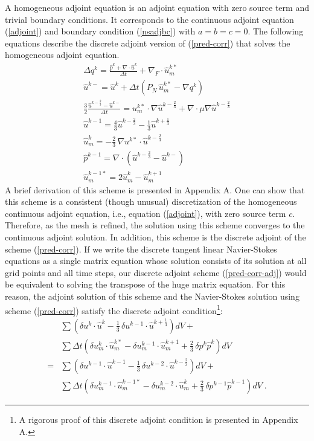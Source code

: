 A homogeneous adjoint equation is an adjoint equation with zero source term
and trivial boundary conditions.  It corresponds to the continuous adjoint
equation (\ref{adjoint}) and boundary condition (\ref{nsadjbc}) with
$a = b = c = 0$.
The following equations describe the discrete adjoint version of
(\ref{pred-corr}) that solves the homogeneous adjoint equation.
\begin{equation} \begin{split} \label{pred-corr-adj}
  \Delta q^k = \frac{\hat p^k + \nabla \cdot \hat u^k}{\Delta t} +
                \nabla_F \cdot \hat u_m^{k*} \\
   \hat u^{k-} = \hat u^k + \Delta t \left( P_N\,\hat u_m^{k*} -
                                            \nabla q^k \right) \\
   \frac 32 \frac{\hat u^{k-\frac23} - \hat u^{k-}}{\Delta t} =
   u_m^{k*} \cdot \nabla \hat u^{k-\frac23}
 + \nabla \cdot \mu \nabla \hat u^{k-\frac23} \\
   \hat u^{k-1} = \frac43 \hat u^{k-\frac23} - \frac13 \hat u^{k+\frac13} \\
   \hat u_m^{k} = -\frac23\, \nabla u^{k*} \cdot \hat u^{k-\frac23} \\
   \hat p^{k-1} = \nabla \cdot \left(\hat u^{k-\frac23} - \hat u^{k-}\right) \\
   \hat u_m^{k-1*} = 2 \hat u_m^{k} - \hat u_m^{k+1}
\end{split} \end{equation}
A brief derivation of this scheme is presented in Appendix A.
One can show that this scheme is a consistent (though unusual) discretization
of the homogeneous continuous adjoint equation, i.e., equation (\ref{adjoint}),
with zero source term $c$.
Therefore, as the mesh is refined, the solution using this scheme converges to
the continuous adjoint solution.  In addition, this scheme is the discrete
adjoint of the scheme (\ref{pred-corr}).
If we write the discrete tangent linear Navier-Stokes
equations as a single matrix equation whose solution consists of its solution
at all grid points and all time steps, our discrete adjoint scheme
(\ref{pred-corr-adj}) would be
equivalent to solving the transpose of the huge matrix equation.  For this
reason, the adjoint solution of this scheme and the Navier-Stokes solution using
scheme (\ref{pred-corr}) satisfy the discrete adjoint condition\footnote{
A rigorous proof of this discrete adjoint condition is presented in Appendix A.
}:
\[\begin{split}
 & \sum \left( \delta u^k \cdot \hat u^k -
   \frac13\, \delta u^{k-1} \cdot \hat u^{k+\frac13} \right) dV + \\
 & \sum \Delta t \left( \delta u_m^k \cdot \hat u_m^{k*} -
                  \delta u_m^{k-1} \cdot \hat u_m^{k+1} +
                  \frac23\, \delta p^k \hat p^k \right) dV \\
=& \sum \left( \delta u^{k-1} \cdot \hat u^{k-1} -
   \frac13\, \delta u^{k-2} \cdot \hat u^{k-\frac23} \right) dV + \\
 & \sum \Delta t \left( \delta u_m^{k-1} \cdot \hat u_m^{k-1*} -
                   \delta u_m^{k-2} \cdot \hat u_m^k
                + \frac23\, \delta p^{k-1} \hat p^{k-1} \right) dV \;.
\end{split} \]
